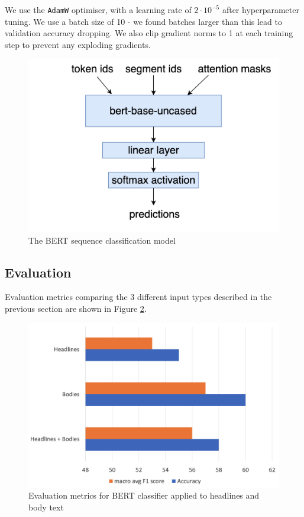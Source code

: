 We use the \texttt{AdamW} \cite{adamw} optimiser, with a learning rate of $ 2 \cdot 10^{-5} $ after hyperparameter tuning. We use a batch size of 10 - we found batches larger than this lead to validation accuracy dropping. We also clip gradient norms to 1 at each training step to prevent any exploding gradients.

\begin{figure}
    \centering
    \includegraphics[scale=0.2]{0-img/bert-sequence-classification.png}
    \caption{The BERT sequence classification model}
    \label{fig:bert-sequence-classification}
\end{figure}

\subsection{Evaluation} \label{subsec:nmr-bert-evaluation}

Evaluation metrics comparing the 3 different input types described in the previous section are shown in Figure \ref{fig:nmr-accuracy-f1}.

\begin{figure}
    \centering
    \includegraphics[scale=0.3]{0-img/nmr-accuracy-f1.png}
    \caption{Evaluation metrics for BERT classifier applied to headlines and body text}
    \label{fig:nmr-accuracy-f1}
\end{figure}

